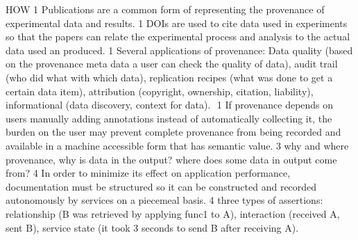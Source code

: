 HOW
1 Publications are a common form of representing the provenance of experimental data and results.
1 DOIs are used to cite data used in experiments so that the papers can relate the experimental process and analysis to the actual data used an produced.
1 Several applications of provenance: Data quality (based on the provenance meta data a user can check the quality of data), audit trail (who did what with which data), replication recipes (what was done to get a certain data item), attribution (copyright, ownership, citation, liability), informational (data discovery, context for data). 
1 If provenance depends on users manually adding annotations instead of automatically collecting it, the burden on the user may prevent complete provenance from being recorded and available in a machine accessible form that has semantic value.
3 why and where provenance, why is data in the output? where does some data in output come from?
4 In order to minimize its effect on application performance, documentation must be structured so it can be constructed and recorded autonomously by services on a piecemeal basis.
4 three types of assertions: relationship (B was retrieved by applying func1 to A), interaction (received A, sent B), service state (it took 3 seconds to send B after receiving A).